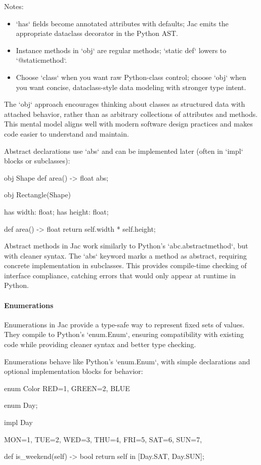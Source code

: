 Notes:
\begin{itemize}
    \item `has` fields become annotated attributes with defaults; Jac emits the appropriate dataclass decorator in the Python AST.
    \item Instance methods in `obj` are regular methods; `static def` lowers to `@staticmethod`.
    \item Choose `class` when you want raw Python-class control; choose `obj` when you want concise, dataclass-style data modeling with stronger type intent.
\end{itemize}

The `obj` approach encourages thinking about classes as structured data with attached behavior, rather than as arbitrary collections of attributes and methods. This mental model aligns well with modern software design practices and makes code easier to understand and maintain.

Abstract declarations use `abs` and can be implemented later (often in `impl` blocks or subclasses):

\begin{jacblock}
obj Shape {
    def area() -> float abs;
}

obj Rectangle(Shape) {
    has width: float;
    has height: float;

    def area() -> float { return self.width * self.height; }
}
\end{jacblock}

Abstract methods in Jac work similarly to Python's `abc.abstractmethod`, but with cleaner syntax. The `abs` keyword marks a method as abstract, requiring concrete implementation in subclasses. This provides compile-time checking of interface compliance, catching errors that would only appear at runtime in Python.

\paragraph{Enumerations}

Enumerations in Jac provide a type-safe way to represent fixed sets of values. They compile to Python's `enum.Enum`, ensuring compatibility with existing code while providing cleaner syntax and better type checking.

Enumerations behave like Python's `enum.Enum`, with simple declarations and optional implementation blocks for behavior:

\begin{jacblock}
enum Color { RED=1, GREEN=2, BLUE }

enum Day;

impl Day {
    MON=1, TUE=2, WED=3, THU=4, FRI=5, SAT=6, SUN=7,

    def is_weekend(self) -> bool { return self in [Day.SAT, Day.SUN]; }
}
\end{jacblock}

